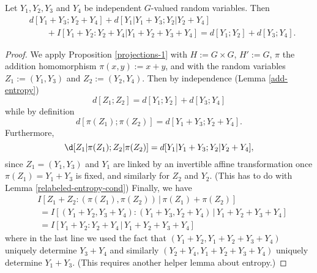 \begin{corollary}\label{cor-fibre}
  Let $Y_1,Y_2,Y_3$ and $Y_4$ be independent $G$-valued random variables.
  Then
\begin{align*}
  & d[Y_1+Y_3; Y_2+Y_4] + d[Y_1|Y_1+Y_3; Y_2|Y_2+Y_4] \\
  &\qquad + I[ Y_1+Y_2 : Y_2 + Y_4 | Y_1+Y_2+Y_3+Y_4 ] = d[Y_1; Y_2] + d[ Y_3; Y_4].
\end{align*}
\end{corollary}

\begin{proof}
  We apply Proposition \ref{projections-1} with $H := G \times G$, $H' := G$, $\pi$ the addition homomorphism $\pi(x,y) := x+y$, and with the random variables $Z_1 := (Y_1,Y_3)$ and $Z_2 := (Y_2,Y_4)$.  Then by independence (Lemma \ref{add-entropy})
\[
  d[Z_1; Z_2] = d[Y_1; Y_2] + d[Y_3; Y_4]
\]
while by definition
\[
  d[\pi(Z_1); \pi(Z_2)] = d[Y_1+Y_3; Y_2+Y_4].
\]
Furthermore,
\[
  \d[Z_1|\pi(Z_1); Z_2|\pi(Z_2)] = d[Y_1|Y_1+Y_3;Y_2|Y_2+Y_4],
\]
since $Z_1=(Y_1,Y_3)$ and $Y_1$ are linked by an invertible affine transformation once $\pi(Z_1)=Y_1+Y_3$ is fixed, and similarly for $Z_2$ and $Y_2$.  (This has to do with Lemma \ref{relabeled-entropy-cond})
Finally, we have
\begin{align*}
  &I[Z_1 + Z_2 : (\pi(Z_1),\pi(Z_2)) \,|\, \pi(Z_1) + \pi(Z_2)] \\
  &\ = I[(Y_1+Y_2, Y_3+Y_4) : (Y_1+Y_3, Y_2+Y_4) \,|\, Y_1+Y_2+Y_3+Y_4] \\
  &\ = I[Y_1+Y_2 : Y_2+Y_4 \,|\, Y_1+Y_2+Y_3+Y_4]
\end{align*}
where in the last line we used the fact that $(Y_1+Y_2, Y_1+Y_2+Y_3+Y_4)$ uniquely determine $Y_3+Y_4$ and similarly
$(Y_2+Y_4, Y_1+Y_2+Y_3+Y_4)$ uniquely determine $Y_1+Y_3$.  (This requires another helper lemma about entropy.)
\end{proof}
